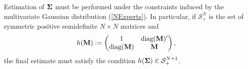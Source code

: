 \documentclass[11pt]{article}
\newcommand{\COR}{\text{COR}}
\theoremstyle{definition}
\theoremstyle{definition}
\def\bSigma{{\bf \Sigma}}
\def\M{{\bf M}}
\def\conv{\text{conv}}
\def\diag{\text{diag}}
\def\diag{\text{diag}}
\begin{document}
Estimation of $\bSigma$ must be performed under the constraints induced by the multivariate Gaussian distribution (\ref{NExperts}). In particular, if $\mathcal{S}_{+}^N$ is the set of  symmetric positive semidefinite $N \times N$ matrices and 
\begin{align*}
h(\M)  := 
\left(\begin{matrix} 
1 & \diag(\M)' \\
\diag(\M) &\M\\
 \end{matrix}\right),
\end{align*}
the final estimate must satisfy the condition $h(\bSigma) \in \mathcal{S}_{+}^{N+1}$. 
\end{document}
